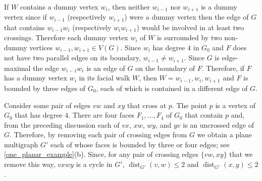 \documentclass{patmorin}
\DeclareMathOperator{\dist}{dist}
\renewcommand{\le}{\leqslant}
\begin{document}
If $W$ contains a dummy vertex $w_i$, then neither $w_{i-1}$ nor $w_{i+1}$ is a dummy vertex since if $w_{i-1}$ (respectively $w_{i+1}$) were a dummy vertex then the edge of $G$ that contains $w_{i-1}w_i$ (respectively $w_iw_{i+1}$) would be involved in at least two crossings.  Therefore each dummy vertex $w_i$ of $W$ is surrounded by two non-dummy vertices $w_{i-1},w_{i+1}\in V(G)$.  Since $w_i$ has degree $4$ in $G_0$ and $F$ does not have two parallel edges on its boundary, $w_{i-1}\neq w_{i+1}$.  Since $G$ is edge-maximal the edge $w_{i-1}w_i$ is an edge of $G$ on the boundary of $F$.  Therefore, if $F$ has a dummy vertex $w_i$ in its facial walk $W$, then $W=w_{i-1},w_i,w_{i+1}$ and $F$ is bounded by three edges of $G_0$, each of which is contained in a different edge of $G$.


Consider some pair of edges $vw$ and $xy$ that cross at $p$.  The point $p$ is a vertex of $G_0$ that has degree $4$.  There are four faces $F_1,\ldots,F_4$ of $G_0$ that contain $p$ and, from the preceding discussion each of $vx$, $xw$, $wy$, and $yv$ is an uncrossed edge of $G$.  Therefore, by removing each pair of crossing edges from $G$ we obtain a plane multigraph $G'$ each of whose faces is bounded by three or four edges; see \cref{one_planar_example}(b).  Since, for any pair of crossing edges $\{vw,xy\}$ that we remove this way, $vxwy$ is a cycle in $G'$, $\dist_{G'}(v,w)\le 2$ and $\dist_{G'}(x,y)\le 2$.
\end{document}
